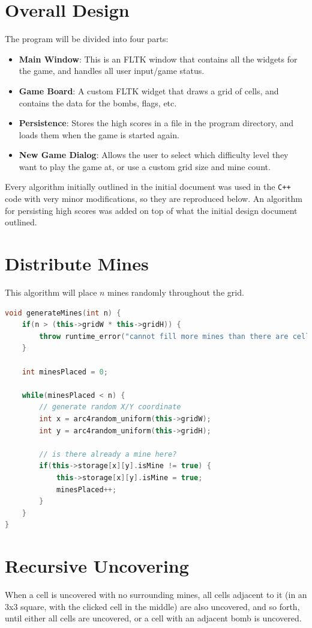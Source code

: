 \documentclass[11pt]{article}
\begin{document}
\section{Overall Design}
The program will be divided into four parts:

\begin{itemize}
	\item \textbf{Main Window}: This is an FLTK window that contains all the widgets for the game, and handles all user input/game status.
	\item \textbf{Game Board}: A custom FLTK widget that draws a grid of cells, and contains the data for the bombs, flags, etc.
	\item \textbf{Persistence}: Stores the high scores in a file in the program directory, and loads them when the game is started again.
	\item \textbf{New Game Dialog}: Allows the user to select which difficulty level they want to play the game at, or use a custom grid size and mine count.
\end{itemize}

Every algorithm initially outlined in the initial document was used in the \texttt{C++} code with very minor modifications, so they are reproduced below. An algorithm for persisting high scores was added on top of what the initial design document outlined.

\section{Distribute Mines}
This algorithm will place $n$ mines randomly throughout the grid.

\begin{lstlisting}[frame=single,language=C++]
void generateMines(int n) {
	if(n > (this->gridW * this->gridH)) {
		throw runtime_error("cannot fill more mines than there are cells");
	}

	int minesPlaced = 0;

	while(minesPlaced < n) {
		// generate random X/Y coordinate
		int x = arc4random_uniform(this->gridW);
		int y = arc4random_uniform(this->gridH);

		// is there already a mine here?
		if(this->storage[x][y].isMine != true) {
			this->storage[x][y].isMine = true;
			minesPlaced++;
		}
	}
}
\end{lstlisting}

\section{Recursive Uncovering}
When a cell is uncovered with no surrounding mines, all cells adjacent to it (in an 3x3 square, with the clicked cell in the middle) are also uncovered, and so forth, until either all cells are uncovered, or a cell with an adjacent bomb is uncovered.
\end{document}
